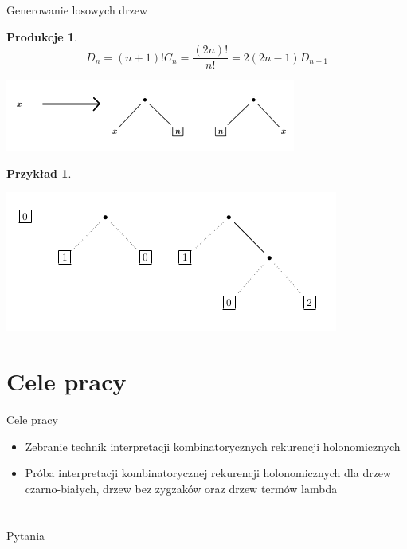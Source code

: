 \documentclass[final]{beamer}
\theoremstyle{bluetheorem}
\theoremstyle{bluetheorem}
\newtheorem{myproductions}[mytheorem]{Produkcje}
\theoremstyle{greentheorem}
\newtheorem{myexample}[mytheorem]{Przykład}
\begin{document}
\begin{frame}{Generowanie losowych drzew}
    \begin{myproductions}
        \[D_n = (n + 1)! C_n = \frac{(2n)!}{n!} = 2 (2n - 1) D_{n-1}\]
        \begin{center}
            \includegraphics[width=.6\textwidth]{gen_001.png}
        \end{center}
    \end{myproductions}

    \begin{myexample}
        \begin{center}
            \includegraphics[width=.5\textwidth]{gen_002.png}
        \end{center}
    \end{myexample}
\end{frame}

\section{Cele pracy}

\begin{frame}{Cele pracy}
    \begin{itemize}
        \item Zebranie technik interpretacji kombinatorycznych rekurencji holonomicznych
        \item Próba interpretacji kombinatorycznej rekurencji holonomicznych dla drzew czarno-białych, drzew bez zygzaków oraz drzew termów lambda
    \end{itemize}
\end{frame}

\section*{}

\begin{frame}{Pytania}
\end{frame}
\end{document}
